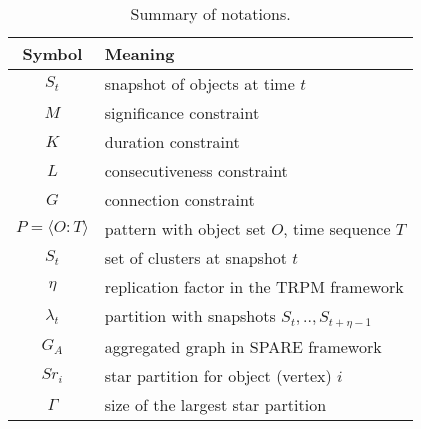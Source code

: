 \begin{table}[h]
\centering
\begin{tabular}{|c|l|} 
\hline
\textbf{Symbol} & \textbf{Meaning} \\
\hline
$S_t$ & snapshot of objects at time $t$ \\
\hline
$M$ & significance constraint \\
\hline 
$K$ & duration constraint\\
\hline
$L$ & consecutiveness constraint\\
\hline
$G$ & connection constraint \\
\hline
$P=\langle O:T \rangle$ & pattern with object set $O$, time sequence $T$\\
\hline
$S_t$ & set of clusters at snapshot $t$\\
\hline
$\eta$ & replication factor in the TRPM framework\\
\hline 
$\lambda_t$ & partition with snapshots $S_t,..,S_{t+\eta-1}$ \\
\hline
$G_A$ & aggregated graph in SPARE framework\\
\hline
$Sr_i $ &  star partition for object (vertex) $i$ \\
\hline 
$\Gamma$ & size of the largest star partition\\
\hline
\end{tabular} 
\vspace{-0.5em}
\caption{Summary of notations.}
\end{table}
